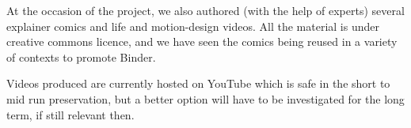 \documentclass{deliverablereport}
\begin{document}
At the occasion of the project, we also authored (with the help of
experts) several explainer comics and life and motion-design videos.
All the material is under creative commons licence, and we have seen
the comics being reused in a variety of contexts to promote Binder.

Videos produced are currently hosted on YouTube which is safe in the
short to mid run preservation, but a better option will have to be
investigated for the long term, if still relevant then.

\printbibliography
\end{document}
